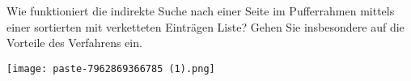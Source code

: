 \documentclass{article}
\begin{document}
\begin{tcolorbox}[colback=white!10!white,colframe=lightgray!75!black,
  savelowerto=\jobname_ex.tex]

\begin{center}
 Wie funktioniert die indirekte Suche nach einer Seite im Pufferrahmen mittels einer
sortierten
mit verketteten Einträgen
Liste? Gehen Sie insbesondere auf die Vorteile des Verfahrens ein. 

\end{center}

\tcblower

\justifying
\texttt{[image: paste-7962869366785 (1).png]}

\end{tcolorbox}
\end{document}

